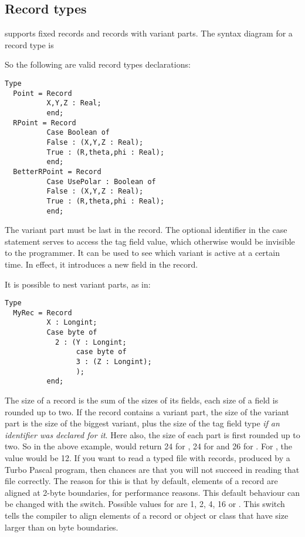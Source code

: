 \documentclass{report}
\begin{document}
\subsection{Record types}
\fpc supports fixed records and records with variant parts.
The syntax diagram for a record type is

So the following are valid record types declarations:
\begin{verbatim}
Type
  Point = Record
          X,Y,Z : Real;
          end;
  RPoint = Record
          Case Boolean of
          False : (X,Y,Z : Real);
          True : (R,theta,phi : Real);
          end;
  BetterRPoint = Record
          Case UsePolar : Boolean of
          False : (X,Y,Z : Real);
          True : (R,theta,phi : Real);
          end;
\end{verbatim}
The variant part must be last in the record. The optional identifier in the
case statement serves to access the tag field value, which otherwise would
be invisible to the programmer. It can be used to see which variant is
active at a certain time. In effect, it introduces a new field in the
record.
\begin{remark}
It is possible to nest variant parts, as in:
\begin{verbatim}
Type
  MyRec = Record
          X : Longint;
          Case byte of
            2 : (Y : Longint;
                 case byte of
                 3 : (Z : Longint);
                 );
          end;
\end{verbatim}
\end{remark}
The size of a record is the sum of the sizes of its fields, each size of a
field is rounded up to two. If the record contains a variant part, the size
of the variant part is the size of the biggest variant, plus the size of the
tag field type {\em if an identifier was declared for it}. Here also, the size of
each part is first rounded up to two. So in the above example,
 would return 24 for , 24 for  and
26 for . For , the value would be 12.
If you want to read a typed file with records, produced by
a Turbo Pascal program, then chances are that you will not succeed in
reading that file correctly.
The reason for this is that by default, elements of a record are aligned at
2-byte boundaries, for performance reasons. This default behaviour can be
changed with the  switch. Possible values for
 are 1, 2, 4, 16 or .
This switch tells the compiler to align elements of a record or object or
class that have size larger than  on  byte boundaries.
\end{document}
